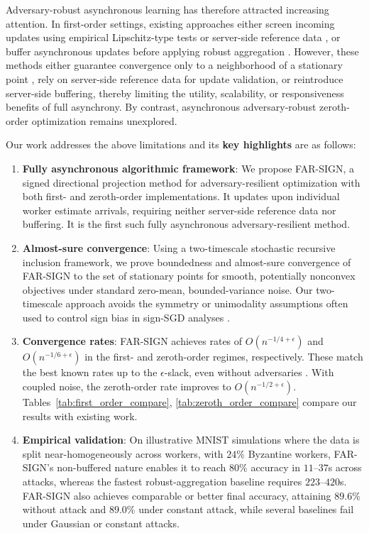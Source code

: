 \documentclass{article}
\newcommand{\farsign}{FAR-SIGN\xspace}
\begin{document}
Adversary-robust asynchronous learning has therefore attracted increasing attention. In first-order settings, existing approaches either screen incoming updates using empirical Lipschitz-type tests or server-side reference data \citep{damaskinos2018asynchronous,xie2020zeno++,fang2022aflguard}, or buffer asynchronous updates before applying robust aggregation \citep{yang2023buffered}. However, these methods either guarantee convergence only to a neighborhood of a stationary point \citep{damaskinos2018asynchronous}, rely on server-side reference data for update validation, or reintroduce server-side buffering, thereby limiting the utility, scalability, or responsiveness benefits of full asynchrony. By contrast, asynchronous adversary-robust zeroth-order optimization remains unexplored.

Our work addresses the above limitations and its \textbf{key highlights} are as follows:

\begin{enumerate}[leftmargin=*]
    \item \textbf{Fully asynchronous algorithmic framework}: We propose \farsign{}, a signed directional projection method for adversary-resilient optimization with both first- and zeroth-order implementations. It updates upon individual worker estimate arrivals, requiring neither server-side reference data nor buffering. It is the first such fully asynchronous adversary-resilient method.

    \item \textbf{Almost-sure convergence}: 
    Using a two-timescale stochastic recursive inclusion framework, we prove boundedness and almost-sure convergence of \farsign{} to the set of stationary points for smooth, potentially nonconvex objectives under standard zero-mean, bounded-variance noise. 
    Our two-timescale approach avoids the symmetry or unimodality assumptions often used to control sign bias in sign-SGD analyses \citep{bernstein2018signsgd}.

    \item \textbf{Convergence rates}: 
    \farsign{} achieves rates of $O(n^{-1/4+\epsilon})$ and $O(n^{-1/6+\epsilon})$ in the first- and zeroth-order regimes, respectively. 
    These match the best known rates up to the $\epsilon$-slack, even without adversaries \citep{arjevani2023lower, la2025gradient}. 
    With coupled noise, the zeroth-order rate improves to $O(n^{-1/2+\epsilon})$. 
    Tables~\ref{tab:first_order_compare}, \ref{tab:zeroth_order_compare} compare our results with existing work.
    
    \item \textbf{Empirical validation}: 
    On illustrative MNIST \citep{lecun1998mnist} simulations where the data is split near-homogeneously across workers, with $24\%$ Byzantine workers, \farsign's non-buffered nature enables it to reach $80\%$ accuracy in $11$--$37$s across attacks, whereas the fastest robust-aggregation baseline requires $223$--$420$s. FAR-SIGN also achieves comparable or better final accuracy, attaining $89.6\%$ without attack and $89.0\%$ under constant attack, while several baselines fail under Gaussian or constant attacks.
\end{enumerate}
\end{document}
